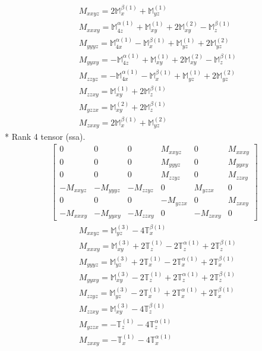 \documentclass[fleqn,8pt,landscape]{jsarticle}
\begin{document}
\begin{align*}
& M_{xxyz} = 2 \mathbb{M}_{x}^{\beta(1)} + \mathbb{M}_{yz}^{(1)} \\
& M_{xxxy} = \mathbb{M}_{4z}^{\alpha(1)} + \mathbb{M}_{xy}^{(1)} + 2 \mathbb{M}_{xy}^{(2)} - \mathbb{M}_{z}^{\beta(1)} \\
& M_{yyyz} = \mathbb{M}_{4x}^{\alpha(1)} - \mathbb{M}_{x}^{\beta(1)} + \mathbb{M}_{yz}^{(1)} + 2 \mathbb{M}_{yz}^{(2)} \\
& M_{yyxy} = - \mathbb{M}_{4z}^{\alpha(1)} + \mathbb{M}_{xy}^{(1)} + 2 \mathbb{M}_{xy}^{(2)} - \mathbb{M}_{z}^{\beta(1)} \\
& M_{zzyz} = - \mathbb{M}_{4x}^{\alpha(1)} - \mathbb{M}_{x}^{\beta(1)} + \mathbb{M}_{yz}^{(1)} + 2 \mathbb{M}_{yz}^{(2)} \\
& M_{zzxy} = \mathbb{M}_{xy}^{(1)} + 2 \mathbb{M}_{z}^{\beta(1)} \\
& M_{yzzx} = \mathbb{M}_{xy}^{(2)} + 2 \mathbb{M}_{z}^{\beta(1)} \\
& M_{zxxy} = 2 \mathbb{M}_{x}^{\beta(1)} + \mathbb{M}_{yz}^{(2)}
\end{align*}
* Rank 4 tensor (ssa).
\begin{align*}
\begin{bmatrix} 0 & 0 & 0 & M_{xxyz} & 0 & M_{xxxy} \\ 0 & 0 & 0 & M_{yyyz} & 0 & M_{yyxy} \\ 0 & 0 & 0 & M_{zzyz} & 0 & M_{zzxy} \\ - M_{xxyz} & - M_{yyyz} & - M_{zzyz} & 0 & M_{yzzx} & 0 \\ 0 & 0 & 0 & - M_{yzzx} & 0 & M_{zxxy} \\ - M_{xxxy} & - M_{yyxy} & - M_{zzxy} & 0 & - M_{zxxy} & 0 \end{bmatrix}
\end{align*}
\begin{align*}
& M_{xxyz} = \mathbb{M}_{yz}^{(3)} - 4 \mathbb{T}_{x}^{\beta(1)} \\
& M_{xxxy} = \mathbb{M}_{xy}^{(3)} + 2 \mathbb{T}_{z}^{(1)} - 2 \mathbb{T}_{z}^{\alpha(1)} + 2 \mathbb{T}_{z}^{\beta(1)} \\
& M_{yyyz} = \mathbb{M}_{yz}^{(3)} + 2 \mathbb{T}_{x}^{(1)} - 2 \mathbb{T}_{x}^{\alpha(1)} + 2 \mathbb{T}_{x}^{\beta(1)} \\
& M_{yyxy} = \mathbb{M}_{xy}^{(3)} - 2 \mathbb{T}_{z}^{(1)} + 2 \mathbb{T}_{z}^{\alpha(1)} + 2 \mathbb{T}_{z}^{\beta(1)} \\
& M_{zzyz} = \mathbb{M}_{yz}^{(3)} - 2 \mathbb{T}_{x}^{(1)} + 2 \mathbb{T}_{x}^{\alpha(1)} + 2 \mathbb{T}_{x}^{\beta(1)} \\
& M_{zzxy} = \mathbb{M}_{xy}^{(3)} - 4 \mathbb{T}_{z}^{\beta(1)} \\
& M_{yzzx} = - \mathbb{T}_{z}^{(1)} - 4 \mathbb{T}_{z}^{\alpha(1)} \\
& M_{zxxy} = - \mathbb{T}_{x}^{(1)} - 4 \mathbb{T}_{x}^{\alpha(1)}
\end{align*}
\end{document}
